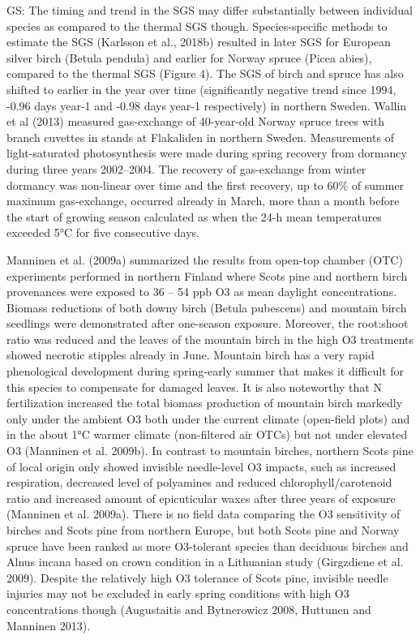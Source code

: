 \documentclass[bg, manuscript]{copernicus}
\begin{document}
GS:
The timing and trend in the SGS may differ substantially between individual species as compared to the thermal SGS though. Species-specific methods to estimate the SGS (Karlsson et al., 2018b) resulted in later SGS for European silver birch (Betula pendula) and earlier for Norway spruce (Picea abies), compared to the thermal SGS (Figure 4). The SGS of birch and spruce has also shifted to earlier in the year over time (significantly negative trend since 1994, -0.96 days year-1 and -0.98 days year-1 respectively) in northern Sweden.
Wallin et al (2013) measured gas-exchange of 40-year-old Norway spruce trees with branch cuvettes in stands at Flakaliden in northern Sweden. Measurements of light-saturated photosynthesis were made during spring recovery from dormancy during three years 2002–2004. The recovery of gas-exchange from winter dormancy was non-linear over time and the first recovery, up to 60\% of summer maximum gas-exchange, occurred already in March, more than a month before the start of growing season calculated as when the 24-h mean temperatures exceeded 5°C for five consecutive days.

Manninen et al. (2009a) summarized the results from open-top chamber (OTC) experiments performed in northern Finland where Scots pine and northern birch provenances were exposed to 36 – 54 ppb O3 as mean daylight concentrations. Biomass reductions of both downy birch (Betula pubescens) and mountain birch seedlings were demonstrated after one-season exposure. Moreover, the root:shoot ratio was reduced and the leaves of the mountain birch in the high O3 treatments showed necrotic stipples already in June. Mountain birch has a very rapid phenological development during spring-early summer that makes it difficult for this species to compensate for damaged leaves. It is also noteworthy that N fertilization increased the total biomass production of mountain birch markedly only under the ambient O3 both under the current climate (open-field plots) and in the about 1°C warmer climate (non-filtered air OTCs) but not under elevated O3 (Manninen et al. 2009b).
In contrast to mountain birches, northern Scots pine of local origin only showed invisible needle-level O3 impacts, such as increased respiration, decreased level of polyamines and reduced chlorophyll/carotenoid ratio and increased amount of epicuticular waxes after three years of exposure (Manninen et al. 2009a). There is no field data comparing the O3 sensitivity of birches and Scots pine from northern Europe, but both Scots pine and Norway spruce have been ranked as more O3-tolerant species than deciduous birches and Alnus incana based on crown condition in a Lithuanian study (Girgzdiene et al. 2009). Despite the relatively high O3 tolerance of Scots pine, invisible needle injuries may not be excluded in early spring conditions with high O3 concentrations though (Augustaitis and Bytnerowicz 2008, Huttunen and Manninen 2013).
\end{document}
